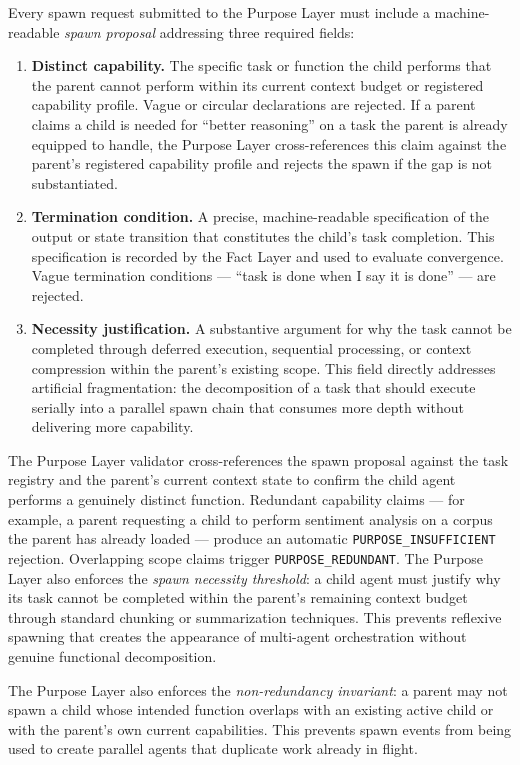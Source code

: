 Every spawn request submitted to the Purpose Layer must include a machine-readable \textit{spawn proposal} addressing three required fields:

\begin{enumerate}
    \itemsep0em
    \item \textbf{Distinct capability.} The specific task or function the child performs that the parent cannot perform within its current context budget or registered capability profile. Vague or circular declarations are rejected. If a parent claims a child is needed for ``better reasoning'' on a task the parent is already equipped to handle, the Purpose Layer cross-references this claim against the parent's registered capability profile and rejects the spawn if the gap is not substantiated.
    \item \textbf{Termination condition.} A precise, machine-readable specification of the output or state transition that constitutes the child's task completion. This specification is recorded by the Fact Layer and used to evaluate convergence. Vague termination conditions — ``task is done when I say it is done'' — are rejected.
    \item \textbf{Necessity justification.} A substantive argument for why the task cannot be completed through deferred execution, sequential processing, or context compression within the parent's existing scope. This field directly addresses artificial fragmentation: the decomposition of a task that should execute serially into a parallel spawn chain that consumes more depth without delivering more capability.
\end{enumerate}

The Purpose Layer validator cross-references the spawn proposal against the task registry and the parent's current context state to confirm the child agent performs a genuinely distinct function. Redundant capability claims — for example, a parent requesting a child to perform sentiment analysis on a corpus the parent has already loaded — produce an automatic \texttt{PURPOSE\_INSUFFICIENT} rejection. Overlapping scope claims trigger \texttt{PURPOSE\_REDUNDANT}. The Purpose Layer also enforces the \textit{spawn necessity threshold}: a child agent must justify why its task cannot be completed within the parent's remaining context budget through standard chunking or summarization techniques. This prevents reflexive spawning that creates the appearance of multi-agent orchestration without genuine functional decomposition.

The Purpose Layer also enforces the \textit{non-redundancy invariant}: a parent may not spawn a child whose intended function overlaps with an existing active child or with the parent's own current capabilities. This prevents spawn events from being used to create parallel agents that duplicate work already in flight.

